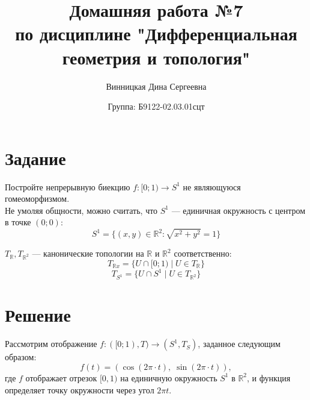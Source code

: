 \documentclass{article}
\title{\vspace{-1cm}Домашняя работа №7 \\ по дисциплине "Дифференциальная геометрия и топология"}
\author{Винницкая Дина Сергеевна}
\date{Группа: Б9122-02.03.01сцт}
\begin{document}
	
	\maketitle


        
        \section{Задание}
        Постройте непрерывную биекцию \( f : [0; 1) \rightarrow S^1 \) не являющуюся гомеоморфизмом.\\ 
        Не умоляя общности, можно считать, что \( S^1 \) — единичная окружность с центром в точке \( (0; 0) \):
        \[
        S^1 = \{ (x, y) \in \mathbb{R}^2 : \sqrt{x^2 + y^2} = 1 \}
        \]
        
        \( T_{\mathbb{R}}, T_{\mathbb{R}^2} \) — канонические топологии на \( \mathbb{R} \) и \( \mathbb{R}^2 \) соответственно:
        \[
        T_{\mathbb{R}x} = \{ U \cap [0; 1) \mid U \in T_{\mathbb{R}} \}
        \]
        \[
        T_{S^1} = \{ U \cap S^1 \mid U \in T_{\mathbb{R}^2} \}
        \]

        
        \section*{Решение}

        Рассмотрим отображение \( f : ([0; 1), T) \rightarrow (S^1, T_{S}) \), заданное следующим образом:
        \[
        f(t) = (\cos(2 \pi \cdot t), \; \sin(2 \pi \cdot t)),
        \]
        где \( f \) отображает отрезок \([0, 1)\) на единичную окружность \( S^1 \) в \( \mathbb{R}^2 \), и функция определяет точку окружности через угол \( 2\pi t \).
        
\end{document}

